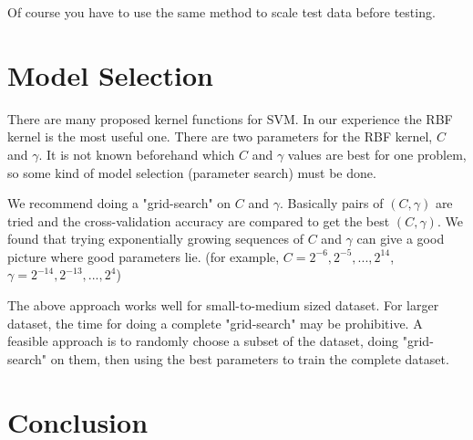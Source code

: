 \documentclass[12pt]{article}
\begin{document}
Of course you have to use the same method to 
scale test data before testing.

\section{Model Selection}

There are many proposed kernel functions for 
SVM. In our experience the RBF kernel is the 
most useful one. There are two parameters
for the RBF kernel, $C$ and $\gamma$. It 
is not known beforehand which $C$ and $\gamma$
values are best for one problem, so some kind of
model selection (parameter search) must be done. 

We recommend doing a "grid-search" on $C$ and
$\gamma$. Basically pairs of $(C,\gamma)$ are tried 
and the cross-validation accuracy are compared to 
get the best $(C,\gamma)$. We found that trying
exponentially growing sequences of $C$ and $\gamma$
can give a good picture where good parameters lie.
(for example, $C=2^{-6},2^{-5},...,2^{14}$, 
$\gamma=2^{-14},2^{-13},...,2^4$)

The above approach works well for small-to-medium 
sized dataset. For larger dataset, the time for
doing a complete "grid-search" may be prohibitive.
A feasible approach is to randomly choose
a subset of the dataset, doing "grid-search" on
them, then using the best parameters to train
the complete dataset.

\section{Conclusion}
\end{document}
